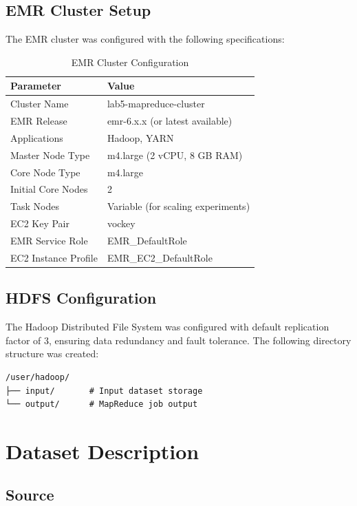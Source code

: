 \documentclass[11pt,a4paper]{article}
\begin{document}
\subsection{EMR Cluster Setup}

The EMR cluster was configured with the following specifications:

\begin{table}[H]
\centering
\begin{tabular}{|l|l|}
\hline
\textbf{Parameter} & \textbf{Value} \\
\hline
Cluster Name & lab5-mapreduce-cluster \\
EMR Release & emr-6.x.x (or latest available) \\
Applications & Hadoop, YARN \\
Master Node Type & m4.large (2 vCPU, 8 GB RAM) \\
Core Node Type & m4.large \\
Initial Core Nodes & 2 \\
Task Nodes & Variable (for scaling experiments) \\
EC2 Key Pair & vockey \\
EMR Service Role & EMR\_DefaultRole \\
EC2 Instance Profile & EMR\_EC2\_DefaultRole \\
\hline
\end{tabular}
\caption{EMR Cluster Configuration}
\label{tab:cluster-config}
\end{table}

\subsection{HDFS Configuration}

The Hadoop Distributed File System was configured with default replication factor of 3, ensuring data redundancy and fault tolerance. The following directory structure was created:

\begin{verbatim}
/user/hadoop/
├── input/       # Input dataset storage
└── output/      # MapReduce job output
\end{verbatim}

\section{Dataset Description}

\subsection{Source}
\end{document}

